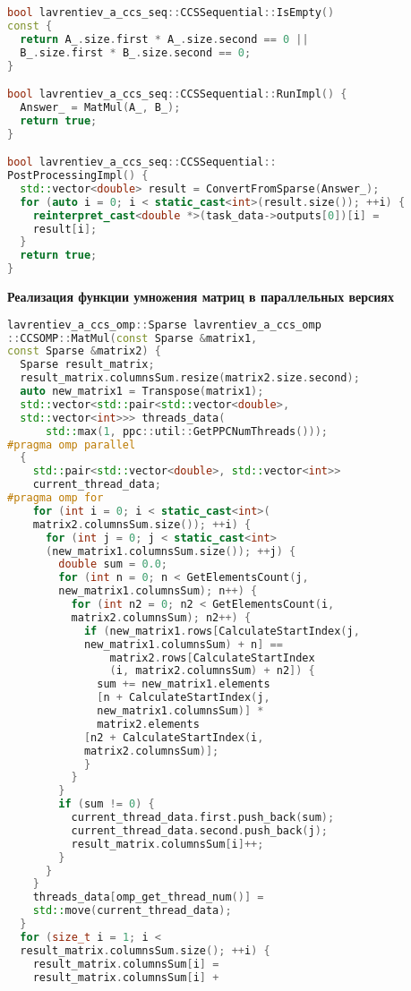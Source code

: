 \documentclass[12pt]{article}
\begin{document}
\begin{lstlisting}[language=C++]
bool lavrentiev_a_ccs_seq::CCSSequential::IsEmpty() 
const {
  return A_.size.first * A_.size.second == 0 || 
  B_.size.first * B_.size.second == 0;
}

bool lavrentiev_a_ccs_seq::CCSSequential::RunImpl() {
  Answer_ = MatMul(A_, B_);
  return true;
}

bool lavrentiev_a_ccs_seq::CCSSequential::
PostProcessingImpl() {
  std::vector<double> result = ConvertFromSparse(Answer_);
  for (auto i = 0; i < static_cast<int>(result.size()); ++i) {
    reinterpret_cast<double *>(task_data->outputs[0])[i] = 
    result[i];
  }
  return true;
}
\end{lstlisting}

\textbf{Реализация функции умножения матриц в параллельных версиях}
\lstset{style=mystyle}
\begin{lstlisting}[language=C++]
lavrentiev_a_ccs_omp::Sparse lavrentiev_a_ccs_omp
::CCSOMP::MatMul(const Sparse &matrix1, 
const Sparse &matrix2) {
  Sparse result_matrix;
  result_matrix.columnsSum.resize(matrix2.size.second);
  auto new_matrix1 = Transpose(matrix1);
  std::vector<std::pair<std::vector<double>, 
  std::vector<int>>> threads_data(
      std::max(1, ppc::util::GetPPCNumThreads()));
#pragma omp parallel
  {
    std::pair<std::vector<double>, std::vector<int>> 
    current_thread_data;
#pragma omp for
    for (int i = 0; i < static_cast<int>(
    matrix2.columnsSum.size()); ++i) {
      for (int j = 0; j < static_cast<int>
      (new_matrix1.columnsSum.size()); ++j) {
        double sum = 0.0;
        for (int n = 0; n < GetElementsCount(j, 
        new_matrix1.columnsSum); n++) {
          for (int n2 = 0; n2 < GetElementsCount(i, 
          matrix2.columnsSum); n2++) {
            if (new_matrix1.rows[CalculateStartIndex(j,
            new_matrix1.columnsSum) + n] ==
                matrix2.rows[CalculateStartIndex
                (i, matrix2.columnsSum) + n2]) {
              sum += new_matrix1.elements
              [n + CalculateStartIndex(j, 
              new_matrix1.columnsSum)] *
              matrix2.elements
            [n2 + CalculateStartIndex(i, 
            matrix2.columnsSum)];
            }
          }
        }
        if (sum != 0) {
          current_thread_data.first.push_back(sum);
          current_thread_data.second.push_back(j);
          result_matrix.columnsSum[i]++;
        }
      }
    }
    threads_data[omp_get_thread_num()] = 
    std::move(current_thread_data);
  }
  for (size_t i = 1; i < 
  result_matrix.columnsSum.size(); ++i) {
    result_matrix.columnsSum[i] = 
    result_matrix.columnsSum[i] + 

\end{lstlisting}
\end{document}
